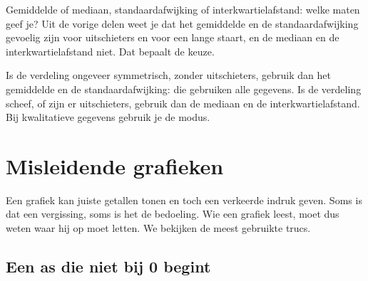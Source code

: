 Gemiddelde of mediaan, standaardafwijking of interkwartielafstand: welke maten geef je? Uit de vorige delen weet je dat het gemiddelde en de standaardafwijking gevoelig zijn voor uitschieters en voor een lange staart, en de mediaan en de interkwartielafstand niet. Dat bepaalt de keuze.

\begin{werkwijze}
Is de verdeling ongeveer symmetrisch, zonder uitschieters, gebruik dan het gemiddelde en de standaardafwijking: die gebruiken alle gegevens. Is de verdeling scheef, of zijn er uitschieters, gebruik dan de mediaan en de interkwartielafstand. Bij kwalitatieve gegevens gebruik je de modus.
\end{werkwijze}


\begin{oefeningen}
\end{oefeningen}

\section{Misleidende grafieken}

Een grafiek kan juiste getallen tonen en toch een verkeerde indruk geven. Soms is dat een vergissing, soms is het de bedoeling. Wie een grafiek leest, moet dus weten waar hij op moet letten. We bekijken de meest gebruikte trucs.


\subsection{Een as die niet bij 0 begint}

